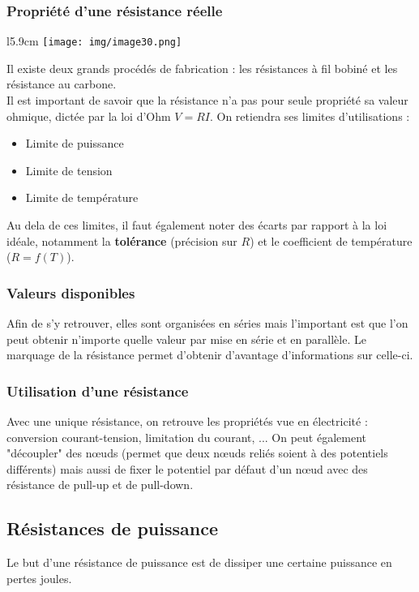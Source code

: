 \subsubsection{Propriété d'une résistance réelle}
\begin{wrapfigure}[11]{l}{5.9cm}
	\texttt{[image: img/image30.png]}
\end{wrapfigure}
Il existe deux grands procédés de fabrication : les résistances à fil bobiné et les résistance au carbone.\\
Il est important de savoir que la résistance n'a pas pour seule propriété sa valeur ohmique, dictée par la loi d'Ohm $V = RI$. On retiendra ses limites d'utilisations :
\begin{itemize}
	\item Limite de puissance
	\item Limite de tension
	\item Limite de température
\end{itemize}
Au dela de ces limites, il faut également noter des écarts par rapport à la loi idéale, notamment la \textbf{tolérance} (précision sur $R$) et le coefficient de température ($R = f(T)$).

\subsubsection{Valeurs disponibles}
Afin de s'y retrouver, elles sont organisées en séries mais l'important est que l'on peut obtenir n'importe quelle valeur par mise en série et en parallèle. Le marquage de la résistance permet d'obtenir d'avantage d'informations sur celle-ci.

\subsubsection{Utilisation d'une résistance}
Avec une unique résistance, on retrouve les propriétés vue en électricité : conversion courant-tension, limitation du courant,  ... On peut également "découpler" des nœuds (permet que deux nœuds reliés soient à des potentiels différents) mais aussi de fixer le potentiel par défaut d'un nœud avec des résistance de pull-up et de pull-down.


\subsection{Résistances de puissance}
Le but d'une résistance de puissance est de dissiper une certaine puissance en pertes joules.

